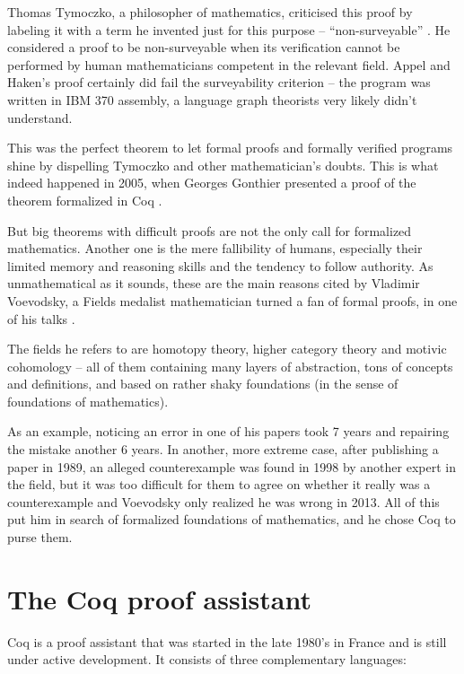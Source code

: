 \documentclass[declaration,inz,english,shortabstract]{iithesis}
\begin{document}
Thomas Tymoczko, a philosopher of mathematics, criticised this proof by labeling it with a term he invented just for this purpose -- ``non-surveyable'' \cite{NonSurveyable}. He considered a proof to be non-surveyable when its verification cannot be performed by human mathematicians competent in the relevant field. Appel and Haken's proof certainly did fail the surveyability criterion -- the program was written in IBM 370 assembly, a language graph theorists very likely didn't understand.

This was the perfect theorem to let formal proofs and formally verified programs shine by dispelling Tymoczko and other mathematician's doubts. This is what indeed happened in 2005, when Georges Gonthier presented a proof of the theorem formalized in Coq \cite{FourColour1} \cite{FourColour2}.

But big theorems with difficult proofs are not the only call for formalized mathematics. Another one is the mere fallibility of humans, especially their limited memory and reasoning skills and the tendency to follow authority. As unmathematical as it sounds, these are the main reasons cited by Vladimir Voevodsky, a Fields medalist mathematician turned a fan of formal proofs, in one of his talks \cite{UnivalentFoundations}.

The fields he refers to are homotopy theory, higher category theory and motivic cohomology -- all of them containing many layers of abstraction, tons of concepts and definitions, and based on rather shaky foundations (in the sense of foundations of mathematics).

As an example, noticing an error in one of his papers took 7 years and repairing the mistake another 6 years. In another, more extreme case, after publishing a paper in 1989, an alleged counterexample was found in 1998 by another expert in the field, but it was too difficult for them to agree on whether it really was a counterexample and Voevodsky only realized he was wrong in 2013. All of this put him in search of formalized foundations of mathematics, and he chose Coq to purse them. 

\section{The Coq proof assistant}

Coq \cite{Coq} is a proof assistant that was started in the late 1980's in France and is still under active development. It consists of three complementary languages:
\end{document}
